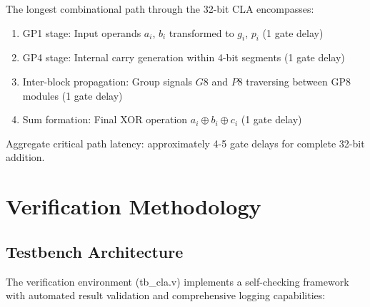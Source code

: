 \documentclass[a4paper, 11pt]{article}
\begin{document}
The longest combinational path through the 32-bit CLA encompasses:

\begin{enumerate}
    \item GP1 stage: Input operands $a_i$, $b_i$ transformed to $g_i$, $p_i$ (1 gate delay)
    \item GP4 stage: Internal carry generation within 4-bit segments (1 gate delay)
    \item Inter-block propagation: Group signals $G8$ and $P8$ traversing between GP8 modules (1 gate delay)
    \item Sum formation: Final XOR operation $a_i \oplus b_i \oplus c_i$ (1 gate delay)
\end{enumerate}

Aggregate critical path latency: approximately 4-5 gate delays for complete 32-bit addition.

\section{Verification Methodology}

\subsection{Testbench Architecture}

The verification environment (tb\_cla.v) implements a self-checking framework with automated result validation and comprehensive logging capabilities:
\end{document}
